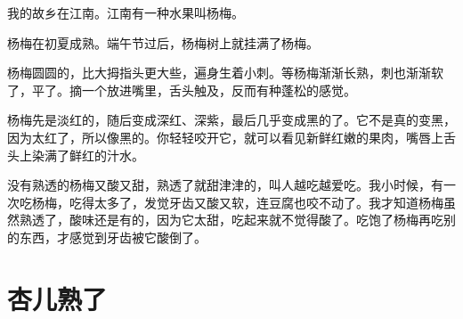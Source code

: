 \documentclass[12pt,UTF-8,openany]{ctexbook}
\begin{document}
\begin{large}
    
    我的故乡在江南。江南有一种水果叫杨梅。
    
    杨梅在初夏成熟。端午节过后，杨梅树上就挂满了杨梅。
    
    杨梅圆圆的，比大拇指头更大些，遍身生着小刺。等杨梅渐渐长熟，刺也渐渐软了，平了。摘一个放进嘴里，舌头触及，反而有种蓬松的感觉。
    
    杨梅先是淡红的，随后变成深红、深紫，最后几乎变成黑的了。它不是真的变黑，因为太红了，所以像黑的。你轻轻咬开它，就可以看见新鲜红嫩的果肉，嘴唇上舌头上染满了鲜红的汁水。
    
    没有熟透的杨梅又酸又甜，熟透了就甜津津的，叫人越吃越爱吃。我小时候，有一次吃杨梅，吃得太多了，发觉牙齿又酸又软，连豆腐也咬不动了。我才知道杨梅虽然熟透了，酸味还是有的，因为它太甜，吃起来就不觉得酸了。吃饱了杨梅再吃别的东西，才感觉到牙齿被它酸倒了。
    
\end{large}



\chapter{杏儿熟了}
\end{document}
